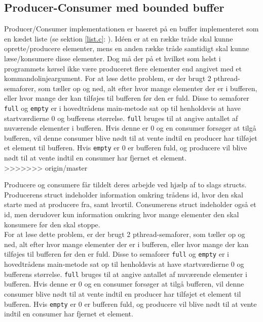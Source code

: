 \subsection{Producer-Consumer med bounded buffer}
Producer/Consumer implementationen er baseret på en buffer implementeret som en kædet liste (se sektion \ref{list.c}: ). Idéen er at en række tråde skal kunne oprette/producere elementer, mens en anden række tråde samtidigt skal kunne læse/konsumere disse elementer. Dog må der på et hvilket som helst i programmets kørsel ikke være produceret flere elementer end angivet med et kommandolinjeargument. For at løse dette problem, er der brugt 2 pthread-semaforer, som tæller op og ned, alt efter hvor mange elementer der er i bufferen, eller hvor mange der kan tilføjes til bufferen før den er fuld. Disse to semaforer \texttt{full} og \texttt{empty} er i hovedtrådens main-metode sat op til henholdsvis at have startværdierne 0 og bufferens størrelse. \texttt{full} bruges til at angive antallet af nuværende elementer i bufferen. Hvis denne er 0 og en consumer forsøger at tilgå bufferen, vil denne consumer blive nødt til at vente indtil en producer har tilføjet et element til bufferen. Hvis \texttt{empty} er 0 er bufferen fuld, og producere vil blive nødt til at vente indtil en consumer har fjernet et element.\\
>>>>>>> origin/master

Producere og consumere får tildelt deres arbejde ved hjælp af to slags structs. Producerens struct indeholder information omkring trådens id, hvor den skal starte med at producere fra, samt hvortil. Consumerens struct indeholder også et id, men derudover kun information omkring hvor mange elementer den skal konsumere før den skal stoppe.\\

For at løse dette problem, er der brugt 2 pthread-semaforer, som tæller op og ned, alt efter hvor mange elementer der er i bufferen, eller hvor mange der kan tilføjes til bufferen før den er fuld. Disse to semaforer \texttt{full} og \texttt{empty} er i hovedtrådens main-metode sat op til henholdsvis at have startværdierne 0 og bufferens størrelse. \texttt{full} bruges til at angive antallet af nuværende elementer i bufferen. Hvis denne er 0 og en consumer forsøger at tilgå bufferen, vil denne consumer blive nødt til at vente indtil en producer har tilføjet et element til bufferen. Hvis \texttt{empty} er 0 er bufferen fuld, og producere vil blive nødt til at vente indtil en consumer har fjernet et element.\\

